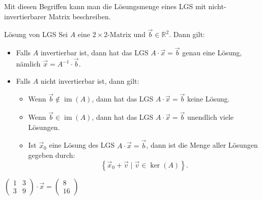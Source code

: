 Mit diesen Begriffen kann man die Lösungsmenge eines LGS mit nicht-invertierbarer Matrix beschreiben.
\begin{satz}{Lösung von LGS }{}
Sei \( A \) eine $2\times2$-Matrix und \( \vec{b} \in \mathbb{R}^2 \). Dann gilt:
\begin{itemize}
    \item Falls $A$ invertierbar ist, dann hat das LGS \( A\cdot \vec{x} = \vec{b} \) genau eine Lösung, nämlich \( \vec{x} = A^{-1}\cdot \vec{b} \).
    \item Falls $A$ nicht invertierbar ist, dann gilt:
\begin{itemize}
    \item Wenn \( \vec{b} \notin \operatorname{im}(A) \), dann hat das LGS \( A\cdot \vec{x} = \vec{b} \) keine Lösung.
    \item Wenn \( \vec{b} \in \operatorname{im}(A) \), dann hat das LGS \( A\cdot \vec{x} = \vec{b} \) unendlich viele Lösungen. 
    \item Ist \( \vec{x}_0 \) eine Lösung des LGS \( A\cdot \vec{x} = \vec{b} \), dann ist die Menge aller Lösungen gegeben durch:
    \[
    \left\{ \vec{x}_0 + \vec{v} \mid \vec{v} \in \ker(A) \right\}.
    \]
\end{itemize}
\end{itemize}
\end{satz}

\begin{bsp}
{ $ \begin{pmatrix} 1 & 3 \\ 3 & 9 \end{pmatrix} \cdot \vec{x} = \begin{pmatrix}
    8\\ 16
\end{pmatrix}$ }{}

\vspace*{7 cm}
\end{bsp}

